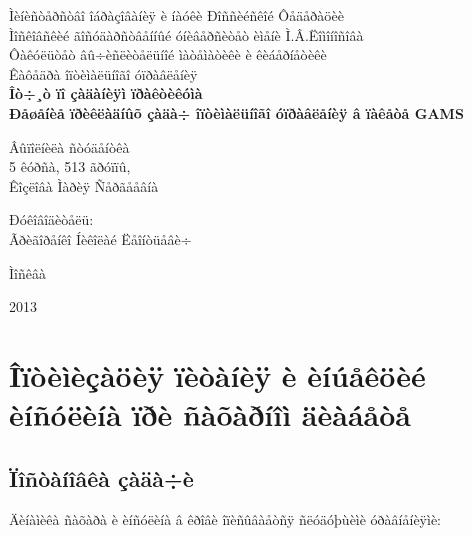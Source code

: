 \documentclass[14pt]{article}
\begin{document}
\begin{titlepage}

\begin{centering}
Ìèíèñòåðñòâî îáðàçîâàíèÿ è íàóêè Ðîññèéñêîé Ôåäåðàöèè\\
Ìîñêîâñêèé ãîñóäàðñòâåííûé óíèâåðñèòåò èìåíè Ì.Â.Ëîìîíîñîâà\\
Ôàêóëüòåò âû÷èñëèòåëüíîé ìàòåìàòèêè è êèáåðíåòèêè\\
Êàôåäðà îïòèìàëüíîãî óïðàâëåíèÿ\\

\vfill
\LARGE
\textbf{Îò÷¸ò ïî çàäàíèÿì ïðàêòèêóìà}\\
\textbf{Ðåøåíèå ïðèêëàäíûõ çàäà÷ îïòèìàëüíîãî óïðàâëåíèÿ â ïàêåòå GAMS}\\

\vfill

\end{centering}

\begin{flushright}

Âûïîëíèëà ñòóäåíòêà\\
5 êóðñà, 513 ãðóïïû,\\
Êîçëîâà Ìàðèÿ Ñåðãååâíà\\

\vspace{0.7cm}

Ðóêîâîäèòåëü:\\
Ãðèãîðåíêî Íèêîëàé Ëåîíòüåâè÷\\

\end{flushright}

\vfill

\centerline{Ìîñêâà}
\centerline{2013}

\end{titlepage}

\pagebreak

\setcounter{page}{2}

\tableofcontents

\newpage

\section{Îïòèìèçàöèÿ ïèòàíèÿ è èíúåêöèé èíñóëèíà ïðè ñàõàðíîì äèàáåòå}
\subsection{Ïîñòàíîâêà çàäà÷è}

Äèíàìèêà ñàõàðà è èíñóëèíà â êðîâè îïèñûâàåòñÿ ñëóäóþùèìè óðàâíåíèÿìè:
\end{document}
